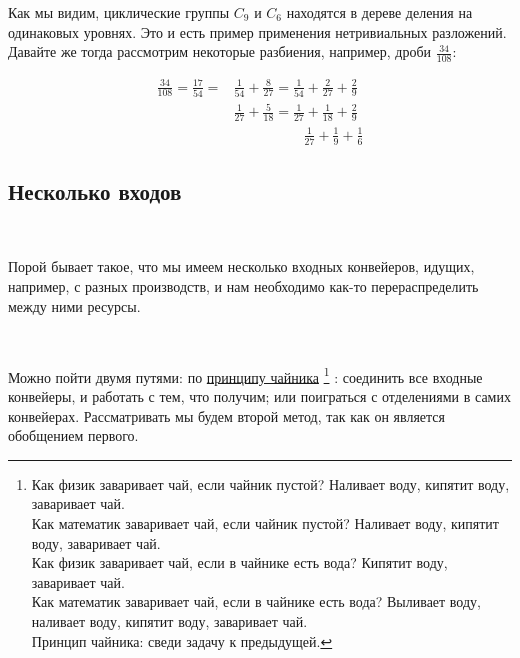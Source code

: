 \vspace{0.3in}

Как мы видим, циклические группы $C_9$ и $C_6$ находятся в дереве деления на одинаковых уровнях. Это и есть пример применения нетривиальных разложений. Давайте же тогда рассмотрим некоторые разбиения, например, дроби $\frac{34}{108}$:


\begin{align*}
	\frac{34}{108} = \frac{17}{54} = &\frac{1}{54} + \frac{8}{27} = \frac{1}{54} + \frac{2}{27} + \frac{2}{9} \\
	&\frac{1}{27} + \frac{5}{18} = \frac{1}{27} + \frac{1}{18} + \frac{2}{9} \\
	&\quad\quad\quad\quad\quad\frac{1}{27} + \frac{1}{9} + \frac{1}{6}
\end{align*}















\vspace{0.5in}

\subsection{Несколько входов}

\

Порой бывает такое, что мы имеем несколько входных конвейеров, идущих, например, с разных производств, и нам необходимо как-то перераспределить между ними ресурсы.

\

Можно пойти двумя путями: по \underline{принципу чайника}%
\footnote{Как физик заваривает чай, если чайник пустой? Наливает воду, кипятит воду, заваривает чай. \\ Как математик заваривает чай, если чайник пустой? Наливает воду, кипятит воду, заваривает чай. \\ Как физик заваривает чай, если в чайнике есть вода? Кипятит воду, заваривает чай. \\ Как математик заваривает чай, если в чайнике есть вода? Выливает воду, наливает воду, кипятит воду, заваривает чай. \\ Принцип чайника: сведи задачу к предыдущей.}
: соединить все входные конвейеры, и работать с тем, что получим; или  поиграться с отделениями в самих конвейерах. Рассматривать мы будем второй метод, так как он является обобщением первого.

